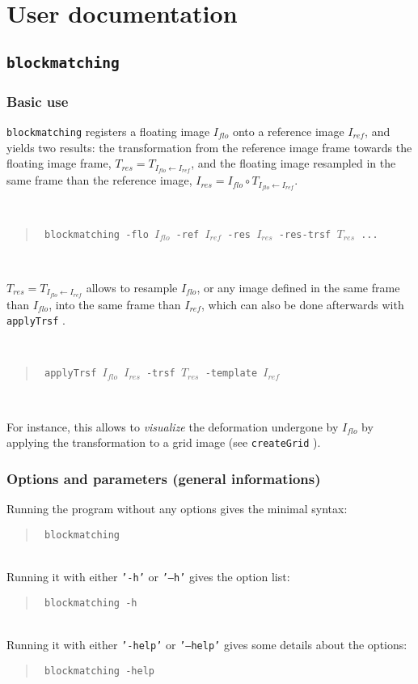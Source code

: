 \documentclass[10pt]{report}
\def\applyTrsf{\texttt{applyTrsf} }
\def\blockmatching{\texttt{blockmatching} }
\def\createGrid{\texttt{createGrid} }
\newcommand{\option}[1]{{\texttt{'#1'}}}
\newenvironment{code}[1]{\mbox{}\\[1ex]\hspace*{-#1cm}\begin{minipage}{150mm}\begin{quote}\tt}{\end{quote}\end{minipage}\mbox{}\\[1ex]}
\begin{document}
\tableofcontents

\newpage

\chapter{User documentation}





\section{\blockmatching}

\subsection{Basic use}

\blockmatching registers a floating image $I_{flo}$ onto a reference image $I_{ref}$, and yields two results: the transformation from the reference image frame towards the floating image frame,  $T_{res} = T_{I_{flo} \leftarrow I_{ref}}$, and the floating image resampled in the same frame than the reference image, $I_{res} = I_{flo} \circ T_{I_{flo} \leftarrow I_{ref}}$.

\begin{code}{0.8}
\% \blockmatching -flo $I_{flo}$ -ref $I_{ref}$ -res $I_{res}$ -res-trsf $T_{res}$ ...
\end{code}

$T_{res} = T_{I_{flo} \leftarrow I_{ref}}$ allows to resample $I_{flo}$, or any image defined in the same frame than $I_{flo}$, into the same frame than $I_{ref}$, which can also be done afterwards with \applyTrsf.

\begin{code}{0.8}
\% \applyTrsf $I_{flo}$ $I_{res}$ -trsf $T_{res}$ -template $I_{ref}$ \\
\end{code}

For instance, this allows to \textit{visualize} the deformation undergone by $I_{flo}$ by applying the transformation to a grid image (see \createGrid). 


\subsection{Options and parameters (general informations)}


Running the program without any options gives the minimal syntax:
\begin{code}{1}
\% \blockmatching 
\end{code}
Running it with either \option{-h} or \option{--h} gives the option list:
\begin{code}{1}
\% \blockmatching -h
\end{code}
Running it with either \option{-help} or \option{--help} gives some details about the options:
\begin{code}{1}
\% \blockmatching -help
\end{code}
\end{document}
